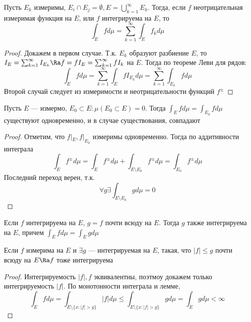 \begin{theorem}
    Пусть \(E_k\) измеримы, \(E_i \cap E_j = \emptyset, E = \bigcup_{k = 1}^\infty E_k\). Тогда, если \(f\) неотрицательная измеримая функция на \(E\), или \(f\) интегрируема на \(E\), то 
    \[\int_E f d \mu = \sum_{k = 1}^\infty \int_E f_k d \mu\]
\end{theorem}
\begin{proof}
    Докажем в первом случае. Т.к. \(E_k\) образуют разбиение \(E\), то \(I_E = \sum_{k = 1}^\infty I_{E_k} \Ra f = fI_{E} = \sum_{k = 1}^\infty f I_k \) на \(E\). Тогда по теореме Леви для рядов:
    \[\int_E f d \mu = \sum_{k = 1}^\infty \int_E fI_{E_k} d \mu = \sum_{k = 1}^\infty \int_{E_k}f d \mu\]
    Второй случай следует из измеримости и неотрицательности функций \(f^\pm\)
\end{proof}

\begin{lemma}
    Пусть \(E\) --- измермо, \(E_0 \subset E: \mu(E_0 \subset E) = 0\). Тогда \(\int_E f d \mu = \int_{E_0} f d \mu\) существуют одновременно, и в случае существования, совпадают
\end{lemma}
\begin{proof}
    Отметим, что \(f|_E, f|_{E_0}\) измеримы одновременно. Тогда по аддитивности интеграла 
    \[\int_E f^\pm d \mu = \int_E f^\pm d \mu + \int_{E \setminus E_0} f^\pm d \mu = \int_{E_0} f^\pm d \mu\]
    Последний переход верен, т.к. 
    \[\forall g \exists \int_{E \setminus E_0} g d \mu = 0\]
\end{proof}

\begin{corollary}
    Если \(f\) интегрируема на \(E\), \(g = f\) почти всюду на \(E\). Тогда \(g\) также интегрируема на \(E\), причем \(\int_E f d \mu = \int_E g d \mu\)
\end{corollary}

\begin{corollary}
    Если \(f\) измерима на \(E\) и \(\exists g\) --- интегрируемая на \(E\), такая, что \(|f| \le g\) почти всюду на \(E \Ra f\) тоже интегрируема
\end{corollary}
\begin{proof}
    Интегрируемость \(|f|, f\) эквивалентны, поэтмоу докажем только интегрируемость \(|f|\). По монотонности интеграла и лемме,
    \[\int_E f d\mu = \int_{E \setminus \{x : |f| > g\}} |f| d \mu \le \int_{E \setminus \{x : |f| > g\}} g d \mu = \int_E g d \mu < \infty\]
\end{proof}

